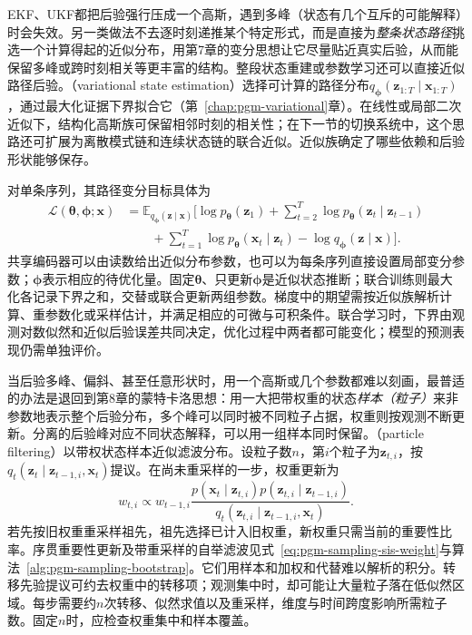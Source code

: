EKF、UKF都把后验强行压成一个高斯，遇到多峰（状态有几个互斥的可能解释）时会失效。另一类做法不去逐时刻递推某个特定形式，而是直接为\emph{整条状态路径}挑选一个计算得起的近似分布，用第7章的变分思想让它尽量贴近真实后验，从而能保留多峰或跨时刻相关等更丰富的结构。整段状态重建或参数学习还可以直接近似路径后验。（variational state estimation）选择可计算的路径分布$q_{\bm\phi}(\bm z_{1:T}\mid\bm x_{1:T})$，通过最大化证据下界拟合它（第~\ref{chap:pgm-variational}章）。在线性或局部二次近似下，结构化高斯族可保留相邻时刻的相关性；在下一节的切换系统中，这个思路还可扩展为离散模式链和连续状态链的联合近似。近似族确定了哪些依赖和后验形状能够保存。

对单条序列，其路径变分目标具体为
\begin{equation}
  \begin{aligned}
  \mathcal L(\bm\theta,\bm\phi;\bm x)
    &=\mathbb E_{q_{\bm\phi}(\bm z\mid\bm x)}
        \biggl[\log p_{\bm\theta}(\bm z_1)
        +\sum_{t=2}^{T}\log p_{\bm\theta}(\bm z_t\mid\bm z_{t-1})\\
    &\qquad{}+\sum_{t=1}^{T}\log p_{\bm\theta}(\bm x_t\mid\bm z_t)
        -\log q_{\bm\phi}(\bm z\mid\bm x)\biggr].
  \end{aligned}
  \label{eq:pgm-dynamic-path-elbo}
\end{equation}
共享编码器可以由读数给出近似分布参数，也可以为每条序列直接设置局部变分参数；$\bm\phi$表示相应的待优化量。固定$\bm\theta$、只更新$\bm\phi$是近似状态推断；联合训练则最大化各记录下界之和，交替或联合更新两组参数。梯度中的期望需按近似族解析计算、重参数化或采样估计，并满足相应的可微与可积条件。联合学习时，下界由观测对数似然和近似后验误差共同决定，优化过程中两者都可能变化；模型的预测表现仍需单独评价。

当后验多峰、偏斜、甚至任意形状时，用一个高斯或几个参数都难以刻画，最普适的办法是退回到第8章的蒙特卡洛思想：用一大把带权重的状态\emph{样本（粒子）}来非参数地表示整个后验分布，多个峰可以同时被不同粒子占据，权重则按观测不断更新。分离的后验峰对应不同状态解释，可以用一组样本同时保留。（particle filtering）以带权状态样本近似滤波分布。设粒子数$n$，第$i$个粒子为$\bm z_{t,i}$，按$q_t(\bm z_t\mid\bm z_{t-1,i},\bm x_t)$提议。在尚未重采样的一步，权重更新为
\[
  w_{t,i}\propto w_{t-1,i}
    \frac{p(\bm x_t\mid\bm z_{t,i})
      p(\bm z_{t,i}\mid\bm z_{t-1,i})}
      {q_t(\bm z_{t,i}\mid\bm z_{t-1,i},\bm x_t)}.
\]
若先按旧权重重采样祖先，祖先选择已计入旧权重，新权重只需当前的重要性比率。序贯重要性更新及带重采样的自举滤波见式~\eqref{eq:pgm-sampling-sis-weight}与算法~\ref{alg:pgm-sampling-bootstrap}。它们用样本和加权和代替难以解析的积分。转移先验提议可约去权重中的转移项；观测集中时，却可能让大量粒子落在低似然区域。每步需要约$n$次转移、似然求值以及重采样，维度与时间跨度影响所需粒子数。固定$n$时，应检查权重集中和样本覆盖。

